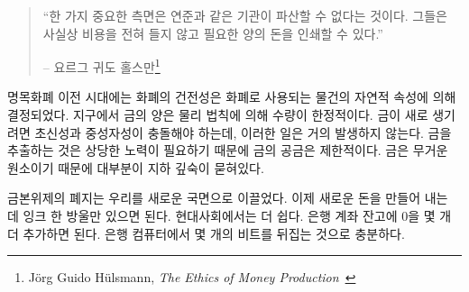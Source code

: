 \begin{samepage}\begin{quotation}
\begin{comment}	
\enquote{One important aspect of this new reality is that institutions like
the Fed cannot go bankrupt. They can print any amount of money that
they might need for themselves at virtually zero cost.}
\end{comment}
\enquote{한 가지 중요한 측면은 연준과 같은 기관이 파산할 수 없다는 것이다. 그들은 사실상 비용을
전혀 들지 않고 필요한 양의 돈을 인쇄할 수 있다.}
\begin{flushright} -- 요르그 귀도 홀스만\footnote{Jörg Guido Hülsmann, \textit{The
Ethics of Money Production}~\cite{hulsmann2008ethics}}
\end{flushright}\end{quotation}\end{samepage}

\begin{comment}	
Before we had fiat currencies, the soundness of money was determined by
the natural properties of the stuff which we used as money. The amount
of gold on earth is limited by the laws of physics. Gold is rare because
supernovae and neutron star collisions are rare. The \enquote{flow} of gold is
limited because extracting it is quite an effort. Being a heavy element
it is mostly buried deep underground.
\end{comment}
명목화폐 이전 시대에는 화폐의 건전성은 화폐로 사용되는 물건의 자연적 속성에 의해 결정되었다.
지구에서 금의 양은 물리 법칙에 의해 수량이 한정적이다.
금이 새로 생기려면 초신성과 중성자성이 충돌해야 하는데, 이러한 일은 거의 발생하지 않는다.
금을 추출하는 것은 상당한 노력이 필요하기 때문에 금의 공금은 제한적이다.
금은 무거운 원소이기 때문에 대부분이 지하 깊숙이 묻혀있다.

\begin{comment}	
The abolishment of the gold standard gave way to a new reality: adding new money
requires just a drop of ink. In our modern world adding a couple of zeros to the
balance of a bank account requires even less effort: flipping a few bits in a
bank computer is enough.
\end{comment}
금본위제의 폐지는 우리를 새로운 국면으로 이끌었다.
이제 새로운 돈을 만들어 내는 데 잉크 한 방울만 있으면 된다.
현대사회에서는 더 쉽다.
은행 계좌 잔고에 0을 몇 개 더 추가하면 된다.
은행 컴퓨터에서 몇 개의 비트를 뒤집는 것으로 충분하다.

